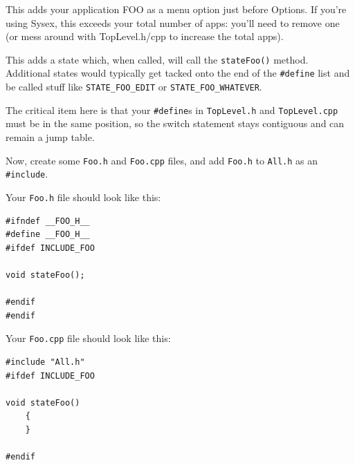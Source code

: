 \documentclass{article}
\begin{document}
This adds your application FOO as a menu option just before Options.  If you're using Sysex, this exceeds your total number of apps: you'll need to remove one (or mess around with TopLevel.h/cpp to increase the total apps).

This adds a state which, when called, will call the \texttt{stateFoo()} method.  Additional states would typically 
get tacked onto the end of the \texttt{\#define} list and be called stuff like \texttt{STATE\_FOO\_EDIT} or \texttt{STATE\_FOO\_WHATEVER}.  

The critical item here is that your \texttt{\#define}s in \texttt{TopLevel.h} and \texttt{TopLevel.cpp} must be in the same position,
so the switch statement stays contiguous and can remain a jump table.

Now, create some \texttt{Foo.h} and \texttt{Foo.cpp} files, and add \texttt{Foo.h} to \texttt{All.h} as an \texttt{\#include}.
 
 Your \texttt{Foo.h} file should look like this:
 
 \begin{verbatim}
#ifndef __FOO_H__
#define __FOO_H__ 
#ifdef INCLUDE_FOO

void stateFoo();

#endif
#endif
\end{verbatim}

Your \texttt{Foo.cpp} file should look like this:

\begin{verbatim}
#include "All.h"
#ifdef INCLUDE_FOO

void stateFoo()
    {
    }

#endif
\end{verbatim}
\end{document}
